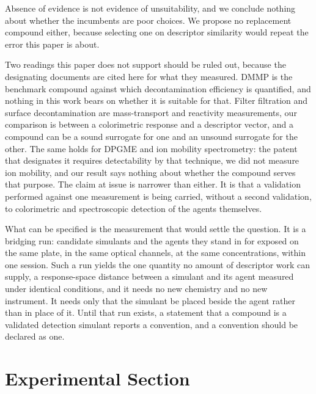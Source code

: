 \documentclass[journal=jacsat,manuscript=article,margin=1in]{achemso}
\begin{document}
Absence of evidence is not evidence of unsuitability, and we conclude
nothing about whether the incumbents are poor choices. We propose no
replacement compound either, because selecting one on descriptor
similarity would repeat the error this paper is about.

Two readings this paper does not support should be ruled out, because the
designating documents are cited here for what they measured. DMMP is the
benchmark compound against which decontamination efficiency is quantified,
and nothing in this work bears on whether it is suitable for that. Filter
filtration and surface decontamination are mass-transport and reactivity
measurements, our comparison is between a colorimetric response and a
descriptor vector, and a compound can be a sound surrogate for one and an
unsound surrogate for the other. The same holds for DPGME and ion mobility
spectrometry: the patent that designates it requires detectability by that
technique, we did not measure ion mobility, and our result says nothing
about whether the compound serves that purpose. The claim at issue is
narrower than either. It is that a validation performed against one
measurement is being carried, without a second validation, to colorimetric
and spectroscopic detection of the agents themselves.

What can be specified is the measurement that would settle the question. It
is a bridging run: candidate simulants and the agents they stand in for
exposed on the same plate, in the same optical channels, at the same
concentrations, within one session. Such a run yields the one quantity no
amount of descriptor work can supply, a response-space distance between a
simulant and its agent measured under identical conditions, and it needs
no new chemistry and no new instrument. It needs only that the simulant be
placed beside the agent rather than in place of it. Until that run exists,
a statement that a compound is a validated detection simulant reports a
convention, and a convention should be declared as one.

\section{Experimental Section}
\end{document}
